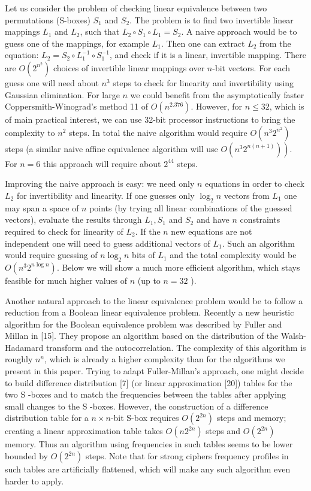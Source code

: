 \documentclass[10pt]{article}
\begin{document}
Let us consider the problem of checking linear equivalence between two permutations (S-boxes) $S_{1}$ and $S_{2}$. The problem is to find two invertible linear mappings $L_{1}$ and $L_{2}$, such that $L_{2} \circ S_{1} \circ L_{1}=S_{2}$. A naive approach would be to guess one of the mappings, for example $L_{1}$. Then one can extract $L_{2}$ from the equation: $L_{2}=S_{2} \circ L_{1}^{-1} \circ S_{1}^{-1}$, and check if it is a linear, invertible mapping. There are $O\left(2^{n^{2}}\right)$ choices of invertible linear mappings over $n$-bit vectors. For each guess one will need about $n^{3}$ steps to check for linearity and invertibility using Gaussian elimination. For large $n$ we could benefit from the asymptotically faster Coppersmith-Winograd's method 11 of $O\left(n^{2.376}\right)$. However, for $n \leq 32$, which is of main practical interest, we can use 32-bit processor instructions to bring the complexity to $n^{2}$ steps. In total the naive algorithm would require $O\left(n^{3} 2^{n^{2}}\right)$ steps (a similar naive affine equivalence algorithm will use $\left.O\left(n^{3} 2^{n(n+1)}\right)\right)$. For $n=6$ this approach will require about $2^{44}$ steps.

Improving the naive approach is easy: we need only $n$ equations in order to check $L_{2}$ for invertibility and linearity. If one guesses only $\log _{2} n$ vectors from $L_{1}$ one may span a space of $n$ points (by trying all linear combinations of the guessed vectors), evaluate the results through $L_{1}, S_{1}$ and $S_{2}$ and have $n$ constraints required to check for linearity of $L_{2}$. If the $n$ new equations are not\\
independent one will need to guess additional vectors of $L_{1}$. Such an algorithm would require guessing of $n \log _{2} n$ bits of $L_{1}$ and the total complexity would be $O\left(n^{3} 2^{n \log n}\right)$. Below we will show a much more efficient algorithm, which stays feasible for much higher values of $n$ (up to $n=32$ ).

Another natural approach to the linear equivalence problem would be to follow a reduction from a Boolean linear equivalence problem. Recently a new heuristic algorithm for the Boolean equivalence problem was described by Fuller and Millan in [15]. They propose an algorithm based on the distribution of the Walsh-Hadamard transform and the autocorrelation. The complexity of this algorithm is roughly $n^{n}$, which is already a higher complexity than for the algorithms we present in this paper. Trying to adapt Fuller-Millan's approach, one might decide to build difference distribution [7] (or linear approximation [20]) tables for the two S -boxes and to match the frequencies between the tables after applying small changes to the S -boxes. However, the construction of a difference distribution table for a $n \times n$-bit S-box requires $O\left(2^{2 n}\right)$ steps and memory; creating a linear approximation table takes $O\left(n 2^{2 n}\right)$ steps and $O\left(2^{2 n}\right)$ memory. Thus an algorithm using frequencies in such tables seems to be lower bounded by $O\left(2^{2 n}\right)$ steps. Note that for strong ciphers frequency profiles in such tables are artificially flattened, which will make any such algorithm even harder to apply.
\end{document}

